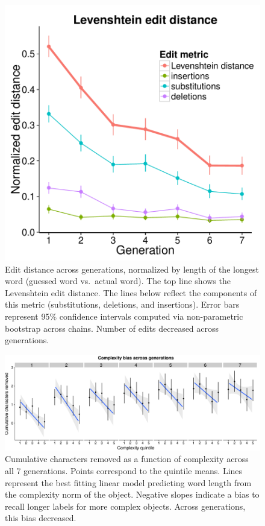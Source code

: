\begin{figure}[t]
\begin{center}
\includegraphics[width = .7\linewidth]{figs/lev.pdf}
\end{center}
\vspace{-.5em}
\caption{Edit distance across generations, normalized by length of the longest word (guessed word vs.\ actual word). The top line shows the Levenshtein edit distance. The lines below reflect the components of this metric (substitutions, deletions, and insertions). Error bars represent 95\% confidence intervals computed via non-parametric bootstrap across chains. Number of edits decreased across generations.}
\label{fig:lev}
\vspace{-1em}
\end{figure}

\begin{figure}[t]
\begin{center}
\includegraphics[scale = .3]{figs/complexity_bias.pdf}
\end{center}
\vspace{-.5em}

\caption{Cumulative characters removed as a function of complexity across all 7 generations. Points correspond to the quintile means. Lines represent the best fitting linear model predicting word length from the complexity norm of the object. Negative slopes indicate a bias to recall longer labels for  more complex objects. Across generations, this bias decreased.}
\label{fig:cbias}
\vspace{-1em}
\end{figure}

